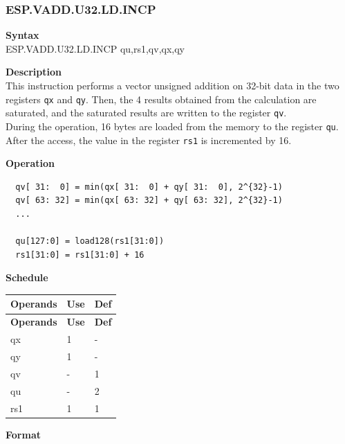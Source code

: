 \newpage
\subsubsection{ESP.VADD.U32.LD.INCP}\label{instruction:ESPVADDU32LDINCP}
\textbf{Syntax}\\
ESP.VADD.U32.LD.INCP qu,rs1,qv,qx,qy

\textbf{Description}\\
This instruction performs a vector unsigned addition on 32-bit data in the two registers \lstinline{qx} and \lstinline{qy}. Then, the 4 results obtained from the calculation are saturated, and the saturated results are written to the register \lstinline{qv}.\\ During the operation, 16 bytes are loaded from the memory to the register \lstinline{qu}. After the access, the value in the register \lstinline{rs1} is incremented by 16.

\textbf{Operation}\\
\begin{lstlisting}
  qv[ 31:  0] = min(qx[ 31:  0] + qy[ 31:  0], 2^{32}-1)
  qv[ 63: 32] = min(qx[ 63: 32] + qy[ 63: 32], 2^{32}-1)
  ...

  qu[127:0] = load128(rs1[31:0])
  rs1[31:0] = rs1[31:0] + 16
\end{lstlisting}

\textbf{Schedule}\\
\begin{longtable}[c]{|l|l|l|}
    \hline
    \rowcolor{lightgray}
    \textbf{Operands} & \textbf{Use} & \textbf{Def} \\\hline
    \endfirsthead
    \hline
    \rowcolor{lightgray}
     \textbf{Operands} & \textbf{Use} & \textbf{Def} \\\hline
    \endhead
    \hline
    \endfoot

    qx & 1 & - \\\hline
  qy & 1 & - \\\hline
     qv & - & 1 \\\hline
     qu & - & 2 \\\hline
     rs1 & 1 & 1

\end{longtable}

\textbf{Format}\\

